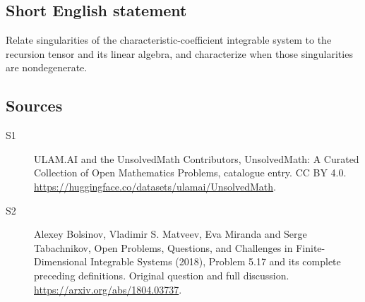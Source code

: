 \documentclass[11pt]{article}
\begin{document}
\subsection{Short English statement}
Relate singularities of the characteristic-coefficient integrable system to the recursion tensor and its linear algebra, and characterize when those singularities are nondegenerate.
\subsection{Sources}
\begin{description}
\item[\hypertarget{source:statement:1}{S1}] ULAM.AI and the UnsolvedMath Contributors, UnsolvedMath: A Curated Collection of Open Mathematics Problems, catalogue entry. CC BY 4.0. \url{https://huggingface.co/datasets/ulamai/UnsolvedMath}.
\item[\hypertarget{source:statement:2}{S2}] Alexey Bolsinov, Vladimir S. Matveev, Eva Miranda and Serge Tabachnikov, Open Problems, Questions, and Challenges in Finite-Dimensional Integrable Systems (2018), Problem 5.17 and its complete preceding definitions. Original question and full discussion. \url{https://arxiv.org/abs/1804.03737}.

\end{description}
\label{end:statement}
\end{document}

